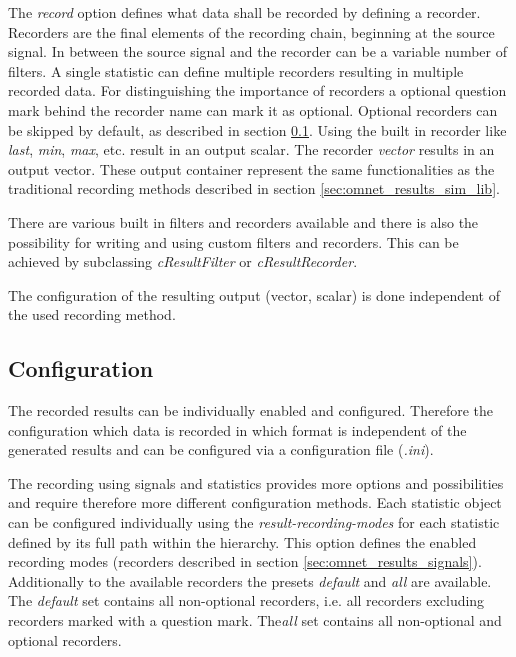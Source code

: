 The \emph{record} option defines what data shall be recorded by defining a recorder.
Recorders are the final elements of the recording chain, beginning at the source signal.
In between the source signal and the recorder can be a variable number of filters.
A single statistic can define multiple recorders resulting in multiple recorded data.
For distinguishing the importance of recorders a optional question mark behind the recorder name can mark it as optional.
Optional recorders can be skipped by default, as described in section \ref{sec:omnet_results_config}.
Using the built in recorder like \emph{last}, \emph{min}, \emph{max}, etc. result in an output scalar.
The recorder \emph{vector} results in an output vector.
These output container represent the same functionalities as the traditional recording methods described in section \ref{sec:omnet_results_sim_lib}.

There are various built in filters and recorders available \cite[section 4.15.2]{omnet_manual} and there is also the possibility for writing and using custom filters and recorders. 
This can be achieved by subclassing \emph{cResultFilter} or \emph{cResultRecorder}. \cite[section 4.15.6]{omnet_manual}

The configuration of the resulting output (vector, scalar) is done independent of the used recording method.

\subsection{Configuration}
\label{sec:omnet_results_config}
The recorded results can be individually enabled and configured.
Therefore the configuration which data is recorded in which format is independent of the generated results and can be configured via a configuration file (\emph{.ini}).

The recording using signals and statistics provides more options and possibilities and require therefore more different configuration methods.
Each statistic object can be configured individually using the \emph{result-recording-modes} for each statistic defined by its full path within the hierarchy.
This option defines the enabled recording modes (recorders described in section \ref{sec:omnet_results_signals}).
Additionally to the available recorders the presets \emph{default} and \emph{all} are available.
The \emph{default} set contains all non-optional recorders, i.e. all recorders excluding recorders marked with a question mark.
The\emph{all} set contains all non-optional and optional recorders. \cite[12.2.1]{omnet_manual}

